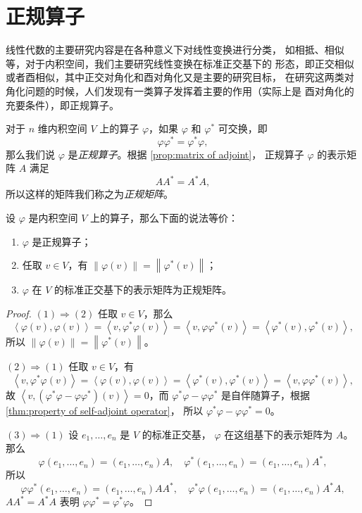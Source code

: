 \documentclass[fontset=none,zihao=-4]{Notes}
\newcommand{\inn}[1]{\left\langle#1\right\rangle}
\newcommand{\norm}[1]{\left\lVert#1\right\rVert}
\begin{document}
\section{正规算子}

线性代数的主要研究内容是在各种意义下对线性变换进行分类，
如相抵、相似等，对于内积空间，我们主要研究线性变换在标准正交基下的
形态，即正交相似或者酉相似，其中正交对角化和酉对角化又是主要的研究目标，
在研究这两类对角化问题的时候，人们发现有一类算子发挥着主要的作用（实际上是
酉对角化的充要条件），即正规算子。

对于 $n$ 维内积空间 $V$ 上的算子 $\varphi$，如果 $\varphi$ 和 $\varphi^*$
可交换，即
\[
  \varphi\varphi^*=\varphi^*\varphi,  
\]
那么我们说 $\varphi$ 是\emph{正规算子}。根据 \autoref{prop:matrix of adjoint}，
正规算子 $\varphi$ 的表示矩阵 $A$ 满足
\[
  AA^*=A^*A,  
\]
所以这样的矩阵我们称之为\emph{正规矩阵}。

\begin{proposition}\label{prop:equiv of normal operator}
  设 $\varphi$ 是内积空间 $V$ 上的算子，那么下面的说法等价：
  \begin{enumerate}
    \item $\varphi$ 是正规算子；
    \item 任取 $v\in V$，有 $\lVert\varphi(v)\rVert=\norm{\varphi^*(v)}$；
    \item $\varphi$ 在 $V$ 的标准正交基下的表示矩阵为正规矩阵。
  \end{enumerate}
\end{proposition}
\begin{proof}
  $(1)\Rightarrow (2)$ 任取 $v\in V$，那么
  \[
    \inn{\varphi(v),\varphi(v)}=\inn{v,\varphi^*\varphi(v)}=
    \inn{v,\varphi\varphi^*(v)}=\inn{\varphi^*(v),\varphi^*(v)},  
  \]
  所以 $\lVert\varphi(v)\rVert=\norm{\varphi^*(v)}$。

  $(2)\Rightarrow (1)$ 任取 $v\in V$，有
  \[
    \inn{v,\varphi^*\varphi(v)}=\inn{\varphi(v),\varphi(v)}
    =\inn{\varphi^*(v),\varphi^*(v)}=\inn{v,\varphi\varphi^*(v)},
  \]
  故 $\inn{v,(\varphi^*\varphi-\varphi\varphi^*)(v)}=0$，而
  $\varphi^*\varphi-\varphi\varphi^*$ 是自伴随算子，根据
  \autoref{thm:property of self-adjoint operator}，
  所以
  $\varphi^*\varphi-\varphi\varphi^*=0$。
  
  $(3)\Rightarrow (1)$ 设 $e_1,\dots,e_n$ 是 $V$ 的标准正交基，
  $\varphi$ 在这组基下的表示矩阵为 $A$。那么
  \[
    \varphi(e_1,\dots,e_n)=(e_1,\dots,e_n)A,\quad 
    \varphi^*(e_1,\dots,e_n)=(e_1,\dots,e_n)A^*,  
  \]
  所以
  \[
    \varphi\varphi^*(e_1,\dots,e_n)=(e_1,\dots,e_n)AA^*,
    \quad \varphi^*\varphi(e_1,\dots,e_n)=(e_1,\dots,e_n)A^*A,  
  \]
  $AA^*=A^*A$ 表明 $\varphi\varphi^*=\varphi^*\varphi$。
\end{proof}
\end{document}
